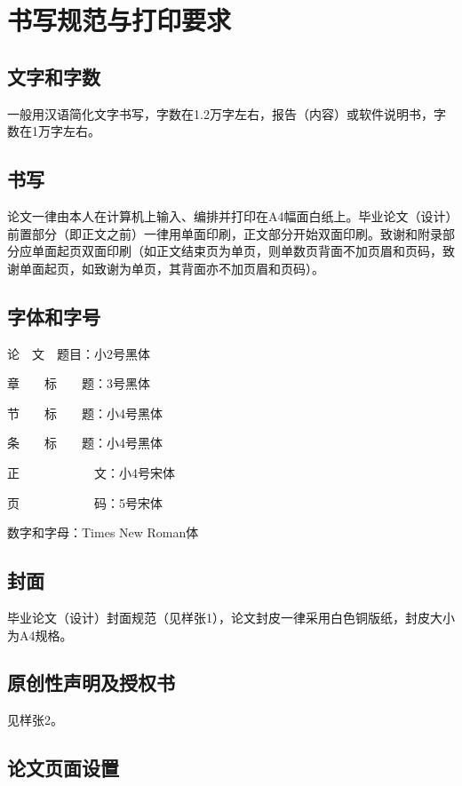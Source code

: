 \chapter{书写规范与打印要求}
\section{文字和字数}
一般用汉语简化文字书写，字数在1.2万字左右，报告（内容）或软件说明书，字数在1万字左右。

\section{书写}
论文一律由本人在计算机上输入、编排并打印在A4幅面白纸上。毕业论文（设计）前置部分（即正文之前）一律用单面印刷，正文部分开始双面印刷。致谢和附录部分应单面起页双面印刷（如正文结束页为单页，则单数页背面不加页眉和页码，致谢单面起页，如致谢为单页，其背面亦不加页眉和页码）。

\section{字体和字号}
论~~文~~题目：\hspace{2cm}小2号黑体

章~~~~标~~~~题：\hspace{2cm}3号黑体

节~~~~标~~~~题：\hspace{2cm}小4号黑体

条~~~~标~~~~题：\hspace{2cm}小4号黑体

正~~~~~~~~~~~~文：\hspace{2cm}小4号宋体

页~~~~~~~~~~~~码：\hspace{2cm}5号宋体

数字和字母：\hspace{2cm}Times New Roman体

\section{封面}
毕业论文（设计）封面规范（见样张1），论文封皮一律采用白色铜版纸，封皮大小为A4规格。

\section{原创性声明及授权书}
见样张2。

\section{论文页面设置}
